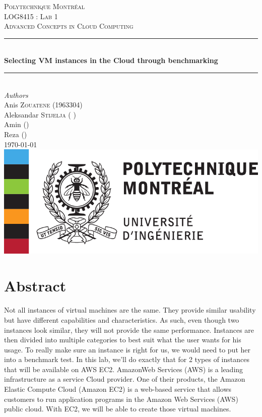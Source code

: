 \documentclass[12pt]{article}
\begin{document}
\begin{titlepage} 
	\newcommand{\HRule}{\rule{\linewidth}{0.5mm}}
	\center
	\textsc{\LARGE Polytechnique Montréal}\\[1.5cm]
	\textsc{\Large LOG8415 : Lab 1}\\[0.5cm]
	\textsc{\large Advanced Concepts in Cloud Computing}\\[0.5cm]
	\HRule\\[0.4cm]
	{\huge\bfseries Selecting VM instances in the Cloud through
	benchmarking}\\[0.4cm]
	\HRule\\[1.5cm]
	{\large\textit{Authors}}\\
	Anis \textsc{Zouatene} (1963304)\\
	Aleksandar \textsc{Stijelja} ( )\\
	Amin \textsc{} ()\\
    Reza \textsc{} ()\\
	\vfill\vfill\vfill {\large\today} \vfill\vfill
	\includegraphics{images/poly-logo.png}\\[1cm]
	\vfill
\end{titlepage}


\section{Abstract}
	\paragraph{} Not all instances of virtual machines are the same. 
    They provide similar usability but have different capabilities 
    and characteristics. As such, even though two instances look similar, 
    they will not provide the same performance. Instances are then divided 
    into multiple categories to best suit what the user wants for his usage. 
    To really make sure an instance is right for us, we would need to put her 
    into a benchmark test. In this lab, we’ll do exactly that for 2 types of 
    instances that will be available on AWS EC2. AmazonWeb Services (AWS) is 
    a leading infrastructure as a service Cloud provider. One of their products, 
    the Amazon Elastic Compute Cloud (Amazon EC2) is a web-based service that 
    allows customers to run application programs in the Amazon Web Services (AWS) 
    public cloud. With EC2, we will be able to create those virtual machines.
\end{document}
